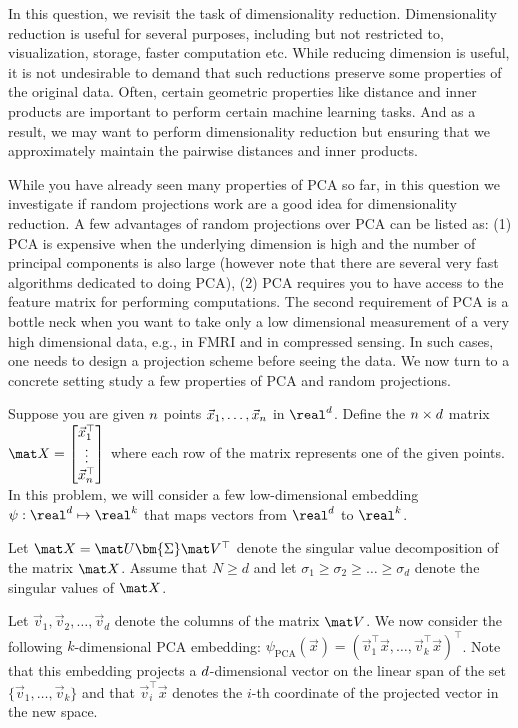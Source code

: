 \documentclass[preview]{standalone}
\begin{document}
In this question, we revisit the task of dimensionality reduction.
Dimensionality reduction is useful for several purposes, including but not
restricted to, visualization, storage, faster computation etc.
While reducing dimension is useful, it is not undesirable to demand that
such reductions preserve some properties of the original data.
Often, certain geometric properties like distance and inner products
are important to perform certain machine learning tasks.
And as a result, we may want to perform dimensionality reduction
but ensuring that we approximately maintain the pairwise distances
and inner products.

While you have already seen many properties of PCA so far, in this question
we investigate if random projections work are a good idea for dimensionality
reduction.
A few advantages of random projections over PCA can be listed as:
(1) PCA is expensive when the underlying dimension is high
and the number of principal components is also large (however note that
there are several very fast algorithms dedicated to doing PCA), 
(2) PCA requires you to have access to the feature matrix for performing
computations. The second requirement of PCA is a bottle neck
when you want to take only a low dimensional measurement of a very
high dimensional data, e.g., in FMRI and in compressed sensing.
In such cases, one needs to design a projection scheme before seeing the data.
We now turn to a concrete setting study a few properties of PCA
and random projections.


Suppose you are given $n$ points $\vec x_1, \ldots, \vec x_n$ in $\real^\dims$.
Define the $n \times d$ matrix $\mat X = \begin{bmatrix}
	\vec x_1^\top \\ \vdots \\ \vec x_\num^\top
\end{bmatrix}$
where each row of the matrix represents one of the given points.
In this problem, we will consider a few low-dimensional embedding $\psi: \real^\dims \mapsto \real^k$
that maps vectors from $\real^\dims$ to $\real^k$.

Let $\mat X = \mat U {\bm{\Sigma}} \mat V^\top$ denote the singular value 
decomposition of the matrix $\mat X$.
Assume that $N \geq d$ and 
let $\sigma_1 \geq \sigma_2 \geq \ldots \geq \sigma_d$ denote the singular values of $\mat X$.

Let $\vec v_1, \vec v_2, \ldots, \vec v_d$ denote the columns
of the matrix $\mat V$.
We now consider the following $k$-dimensional PCA embedding: 
$\psi_{\text{PCA}}(\vec x) = (\vec v_1^\top \vec x, \ldots, \vec v_k^\top \vec x)^\top$.
Note that this embedding projects a $d$-dimensional vector on the linear span
of the set $\{\vec v_1, \ldots, \vec v_k \}$ and that $\vec v_i^\top \vec x$
denotes the $i$-th coordinate of the projected vector in the new space.
\end{document}
